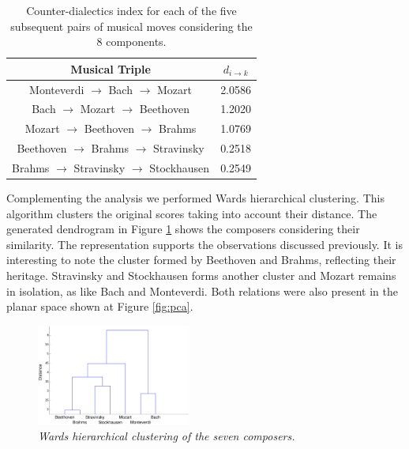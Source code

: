 \documentclass[
 aip,
 jmp,
 amsmath,amssymb,
 reprint,
]{revtex4-1}
\begin{document}
\begin{table}[ht]
\caption{\label{tab:tableE} Counter-dialectics index for each
of the five subsequent pairs of musical moves considering the 8 components.}

\begin{tabular}{|c||c|}
\hline
Musical Triple & $d_{i \rightarrow k}$ \\
\hline \hline

 Monteverdi $\to$ Bach $\to$ Mozart          & 2.0586 \\
 Bach $\to$ Mozart $\to$ Beethoven           & 1.2020 \\
 Mozart $\to$ Beethoven $\to$ Brahms         & 1.0769 \\
 Beethoven $\to$ Brahms $\to$ Stravinsky     & 0.2518 \\
 Brahms $\to$ Stravinsky $\to$ Stockhausen   & 0.2549 \\

\hline
\end{tabular}
\end{table}

Complementing the analysis we performed Wards hierarchical
clustering. This algorithm clusters the original scores taking into
account their distance. The generated dendrogram in
Figure \ref{fig:dendrogram} shows the composers
considering their similarity. The representation supports the
observations discussed previously. It is interesting to note the cluster
formed by Beethoven and Brahms, reflecting their heritage. Stravinsky
and Stockhausen forms another cluster and Mozart remains in isolation,
as like Bach and Monteverdi. Both relations were also present in the
planar space shown at Figure \ref{fig:pca}.

\begin{figure}[ht]
        \begin{center}
          \includegraphics[width=0.45\textwidth]{Clust_Compositores.eps}
        \end{center}
        \caption{\it Wards hierarchical clustering of the seven composers.}
        \label{fig:dendrogram}
\end{figure}
\end{document}
